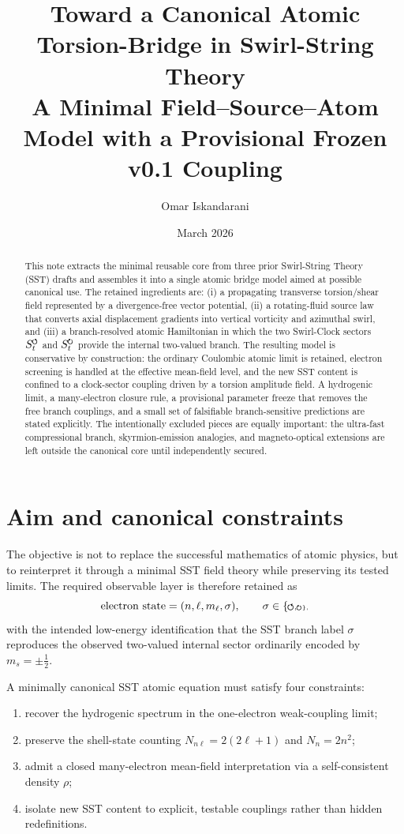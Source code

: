 \documentclass[11pt,a4paper]{article}
\title{Toward a Canonical Atomic Torsion-Bridge in Swirl-String Theory\\
\large A Minimal Field--Source--Atom Model with a Provisional Frozen v0.1 Coupling}
\author{Omar Iskandarani}
\date{March 2026}
\newcommand{\swirlarrow}{\mathchoice{\mkern-2mu\scriptstyle\boldsymbol{\circlearrowleft}}{\mkern-2mu\scriptstyle\boldsymbol{\circlearrowleft}}{\mkern-2mu\scriptscriptstyle\boldsymbol{\circlearrowleft}}{\mkern-2mu\scriptscriptstyle\boldsymbol{\circlearrowleft}}}
\newcommand{\swirlarrowcw}{\mathchoice{\mkern-2mu\scriptstyle\boldsymbol{\circlearrowright}}{\mkern-2mu\scriptstyle\boldsymbol{\circlearrowright}}{\mkern-2mu\scriptscriptstyle\boldsymbol{\circlearrowright}}{\mkern-2mu\scriptscriptstyle\boldsymbol{\circlearrowright}}}
\newcommand{\SwirlClock}{S_t^{\swirlarrow}}
\newcommand{\SwirlClockcw}{S_t^{\swirlarrowcw}}
\begin{document}
\maketitle

\begin{abstract}
This note extracts the minimal reusable core from three prior Swirl-String Theory (SST) drafts and assembles it into a single atomic bridge model aimed at possible canonical use. The retained ingredients are: (i) a propagating transverse torsion/shear field represented by a divergence-free vector potential, (ii) a rotating-fluid source law that converts axial displacement gradients into vertical vorticity and azimuthal swirl, and (iii) a branch-resolved atomic Hamiltonian in which the two Swirl-Clock sectors $\SwirlClock$ and $\SwirlClockcw$ provide the internal two-valued branch. The resulting model is conservative by construction: the ordinary Coulombic atomic limit is retained, electron screening is handled at the effective mean-field level, and the new SST content is confined to a clock-sector coupling driven by a torsion amplitude field. A hydrogenic limit, a many-electron closure rule, a provisional parameter freeze that removes the free branch couplings, and a small set of falsifiable branch-sensitive predictions are stated explicitly. The intentionally excluded pieces are equally important: the ultra-fast compressional branch, skyrmion-emission analogies, and magneto-optical extensions are left outside the canonical core until independently secured.
\end{abstract}

\section{Aim and canonical constraints}
The objective is not to replace the successful mathematics of atomic physics, but to reinterpret it through a minimal SST field theory while preserving its tested limits. The required observable layer is therefore retained as
\begin{equation}
\label{eq:state-labels}
\text{electron state}=(n,\ell,m_\ell,\sigma),
\qquad
\sigma\in\{\swirlarrow,\swirlarrowcw\},
\end{equation}
with the intended low-energy identification that the SST branch label $\sigma$ reproduces the observed two-valued internal sector ordinarily encoded by $m_s=\pm \tfrac12$.

A minimally canonical SST atomic equation must satisfy four constraints:
\begin{enumerate}[label=(C\arabic*)]
    \item recover the hydrogenic spectrum in the one-electron weak-coupling limit;
    \item preserve the shell-state counting $N_{n\ell}=2(2\ell+1)$ and $N_n=2n^2$;
    \item admit a closed many-electron mean-field interpretation via a self-consistent density $\rho$;
    \item isolate new SST content to explicit, testable couplings rather than hidden redefinitions.
\end{enumerate}
\end{document}
